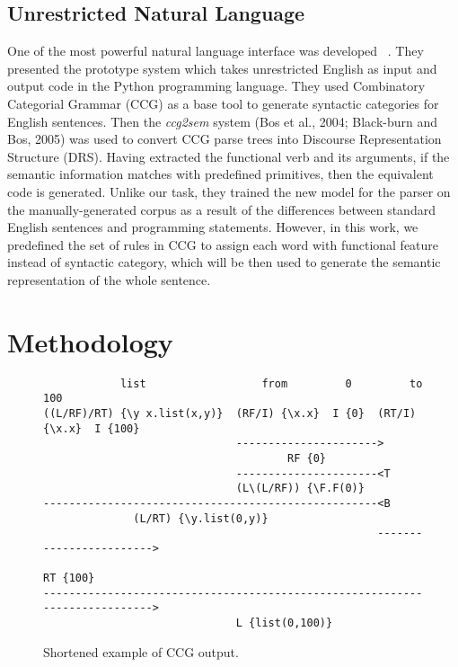 \documentclass[11pt,letterpaper]{article}
\begin{document}
\subsection{Unrestricted Natural Language}
One of the most powerful natural language interface was developed ~\cite{Vadas2005ProgrammingWU}. 
They presented the prototype system which takes unrestricted English as input and output code in the Python programming language. 
They used Combinatory Categorial Grammar (CCG) as a base tool to generate syntactic categories for English sentences. 
Then the \textit{ccg2sem} system (Bos et al., 2004; Black-burn and Bos, 2005) was used to convert CCG parse trees into Discourse Representation Structure (DRS). 
Having extracted the functional verb and its arguments, if the semantic information matches with predefined primitives, then the equivalent code is generated. 
Unlike our task, they trained the new model for the parser on the manually-generated corpus as a result of the differences between standard English sentences and programming statements. 
However, in this work, we predefined the set of rules in CCG to assign each word with functional feature instead of syntactic category, which will be then used to generate the semantic representation of the whole sentence.

\section{Methodology}

\begin{figure*}[t]
  \small
  \begin{verbatim}
            list                  from         0         to          100
((L/RF)/RT) {\y x.list(x,y)}  (RF/I) {\x.x}  I {0}  (RT/I) {\x.x}  I {100}
                              ---------------------->
                                      RF {0}
                              ----------------------<T
                              (L\(L/RF)) {\F.F(0)}
----------------------------------------------------<B
              (L/RT) {\y.list(0,y)}
                                                    ------------------------>
                                                            RT {100}
---------------------------------------------------------------------------->
                              L {list(0,100)}
  \end{verbatim}
  \caption{\label{font-figure} Shortened example of CCG output.}
\end{figure*}
\end{document}

